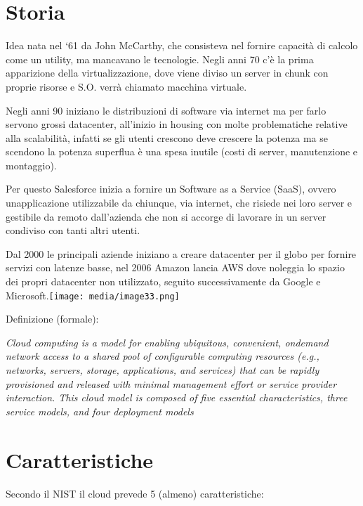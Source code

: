 \section{Storia}\label{storia}

Idea nata nel `61 da John McCarthy, che consisteva nel fornire capacità
di calcolo come un utility, ma mancavano le tecnologie. Negli anni 70
c'è la prima apparizione della virtualizzazione, dove viene diviso un
server in chunk con proprie risorse e S.O. verrà chiamato macchina
virtuale.

Negli anni 90 iniziano le distribuzioni di software via internet ma per
farlo servono grossi datacenter, all'inizio in housing con molte
problematiche relative alla scalabilità, infatti se gli utenti crescono
deve crescere la potenza ma se scendono la potenza superflua è una spesa
inutile (costi di server, manutenzione e montaggio).

Per questo Salesforce inizia a fornire un Software as a Service (SaaS),
ovvero un\textquotesingle applicazione utilizzabile da chiunque, via
internet, che risiede nei loro server e gestibile da remoto dall'azienda
che non si accorge di lavorare in un server condiviso con tanti altri
utenti.

Dal 2000 le principali aziende iniziano a creare datacenter per il globo
per fornire servizi con latenze basse, nel 2006 Amazon lancia AWS dove
noleggia lo spazio dei propri datacenter non utilizzato, seguito
successivamente da Google e
Microsoft.\texttt{[image: media/image33.png]}

Definizione (formale):

\emph{Cloud computing is a model for enabling ubiquitous, convenient,
ondemand network access to a shared pool of configurable computing
resources (e.g., networks, servers, storage, applications, and services)
that can be rapidly provisioned and released with minimal management
effort or service provider interaction. This cloud model is composed of
five essential characteristics, three service models, and four
deployment models}

\section{Caratteristiche}\label{caratteristiche}

Secondo il NIST il cloud prevede 5 (almeno) caratteristiche:

